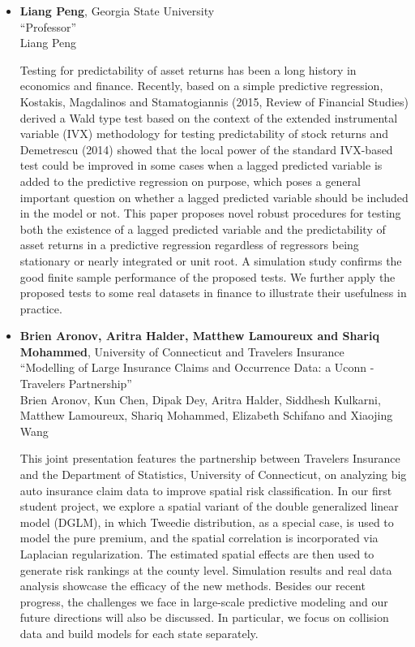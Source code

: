 \begin{itemize}
\item \textbf{Liang Peng}, Georgia State University \\
``Professor'' \\
Liang Peng


Testing for predictability of asset returns has been a long history in economics and finance. Recently, based on a simple predictive regression, Kostakis, Magdalinos and Stamatogiannis (2015,  Review of Financial Studies) derived a Wald type test based on the context of the extended instrumental variable (IVX) methodology for testing predictability of stock returns and Demetrescu (2014) showed that the local power of the standard IVX-based test could be improved in some cases when a lagged predicted variable is added to the predictive regression on purpose, which poses a general important question on whether a lagged predicted variable should be included in the model or not. This paper proposes novel robust   procedures for testing both the existence of a lagged predicted variable and the predictability of asset returns in a predictive regression regardless of regressors being stationary or nearly integrated or unit root. A simulation study confirms the good finite sample performance of the proposed tests. We further apply the proposed tests to some real datasets in finance to illustrate their usefulness in practice.

\item \textbf{Brien Aronov, Aritra Halder, Matthew Lamoureux and Shariq Mohammed}, University of Connecticut and Travelers Insurance \\
``Modelling of Large Insurance Claims and Occurrence Data: a Uconn - Travelers Partnership'' \\
Brien Aronov, Kun Chen, Dipak Dey, Aritra Halder, Siddhesh Kulkarni, Matthew Lamoureux, Shariq Mohammed, Elizabeth Schifano and Xiaojing Wang


This joint presentation features the partnership between Travelers Insurance and the Department of Statistics, University of Connecticut, on analyzing big auto insurance claim data to improve spatial risk classification. In our first student project, we explore a spatial variant of the double generalized linear model (DGLM), in which Tweedie distribution, as a special case, is used to model the pure premium, and the spatial correlation is incorporated via Laplacian regularization. The estimated spatial effects are then used to generate risk rankings at the county level. Simulation results and real data analysis showcase the efficacy of the new methods. Besides our recent progress, the challenges we face in large-scale predictive modeling and our future directions will also be discussed. In particular, we focus on collision data and build models for each state separately.


\end{itemize}
